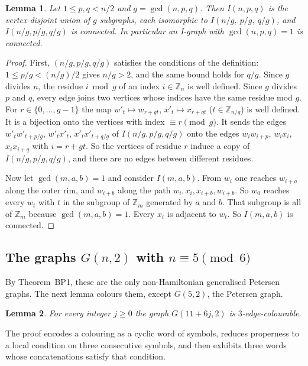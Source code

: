 \documentclass[11pt]{amsart}
\theoremstyle{plain}
\newcommand{\letteredname}{}
\newtheorem*{letteredinner}{Lemma \letteredname}
\newenvironment{lettered}[1]{\renewcommand{\letteredname}{#1}\begin{letteredinner}}{\end{letteredinner}}
\theoremstyle{definition}
\theoremstyle{remark}
\numberwithin{equation}{section}
\newcommand{\Z}{\mathbb{Z}}
\begin{document}
\begin{lettered}{C (components of an I-graph)}
Let \(1\le p,q<n/2\) and \(g=\gcd(n,p,q)\). Then \(I(n,p,q)\) is the vertex-disjoint union of \(g\) subgraphs, each isomorphic to \(I(n/g,\ p/g,\ q/g)\), and \(I(n/g,p/g,q/g)\) is connected. In particular an I-graph with \(\gcd(n,p,q)=1\) is connected.
\end{lettered}

\begin{proof}
First, \((n/g,p/g,q/g)\) satisfies the conditions of the definition: \(1\le p/g<(n/g)/2\) gives \(n/g>2\), and the same bound holds for \(q/g\). Since \(g\) divides \(n\), the residue \(i\bmod g\) of an index \(i\in\Z_n\) is well defined. Since \(g\) divides \(p\) and \(q\), every edge joins two vertices whose indices have the same residue mod \(g\). For \(r\in\{0,\dots,g-1\}\) the map \(w'_t\mapsto w_{r+gt}\), \(x'_t\mapsto x_{r+gt}\) (\(t\in\Z_{n/g}\)) is well defined. It is a bijection onto the vertices with index \(\equiv r\pmod g\). It sends the edges \(w'_tw'_{t+p/g}\), \(w'_tx'_t\), \(x'_tx'_{t+q/g}\) of \(I(n/g,p/g,q/g)\) onto the edges \(w_iw_{i+p}\), \(w_ix_i\), \(x_ix_{i+q}\) with \(i=r+gt\). So the vertices of residue \(r\) induce a copy of \(I(n/g,p/g,q/g)\), and there are no edges between different residues.

Now let \(\gcd(m,a,b)=1\) and consider \(I(m,a,b)\). From \(w_i\) one reaches \(w_{i+a}\) along the outer rim, and \(w_{i+b}\) along the path \(w_i,x_i,x_{i+b},w_{i+b}\). So \(w_0\) reaches every \(w_t\) with \(t\) in the subgroup of \(\Z_m\) generated by \(a\) and \(b\). That subgroup is all of \(\Z_m\) because \(\gcd(m,a,b)=1\). Every \(x_t\) is adjacent to \(w_t\). So \(I(m,a,b)\) is connected.
\end{proof}

\subsection{The graphs \texorpdfstring{\(G(n,2)\)}{G(n,2)} with \texorpdfstring{\(n\equiv5\pmod 6\)}{n = 5 mod 6}}

By Theorem~BP1, these are the only non-Hamiltonian generalised Petersen graphs. The next lemma colours them, except \(G(5,2)\), the Petersen graph.

\begin{lettered}{G}
For every integer \(j\ge0\) the graph \(G(11+6j,2)\) is \(3\)-edge-colourable.
\end{lettered}

The proof encodes a colouring as a cyclic word of symbols, reduces properness to a local condition on three consecutive symbols, and then exhibits three words whose concatenations satisfy that condition.
\end{document}
